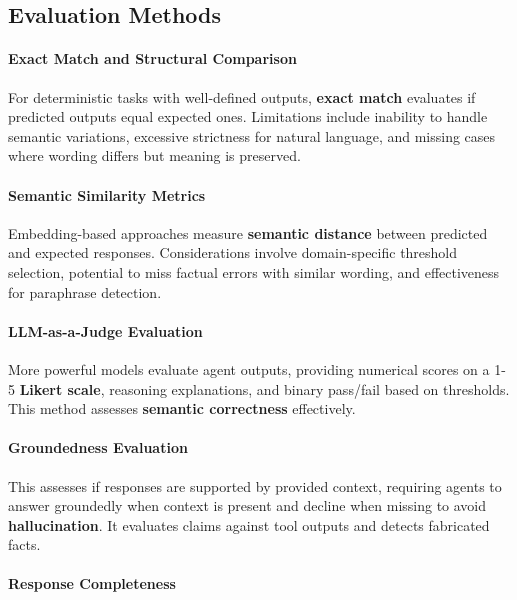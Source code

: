 \begin{TNtwocol}
\subsection*{Evaluation Methods}

\paragraph{\textbf{Exact Match and Structural Comparison}}

For deterministic tasks with well-defined outputs, \textbf{exact match} evaluates if predicted outputs equal expected ones. Limitations include inability to handle semantic variations, excessive strictness for natural language, and missing cases where wording differs but meaning is preserved.

\paragraph{\textbf{Semantic Similarity Metrics}}

Embedding-based approaches measure \textbf{semantic distance} between predicted and expected responses. Considerations involve domain-specific threshold selection, potential to miss factual errors with similar wording, and effectiveness for paraphrase detection.

\paragraph{\textbf{LLM-as-a-Judge Evaluation}}

More powerful models evaluate agent outputs, providing numerical scores on a 1-5 \textbf{Likert scale}, reasoning explanations, and binary pass/fail based on thresholds. This method assesses \textbf{semantic correctness} effectively.

\paragraph{\textbf{Groundedness Evaluation}}

This assesses if responses are supported by provided context, requiring agents to answer groundedly when context is present and decline when missing to avoid \textbf{hallucination}. It evaluates claims against tool outputs and detects fabricated facts.

\paragraph{\textbf{Response Completeness}}


\end{TNtwocol}
